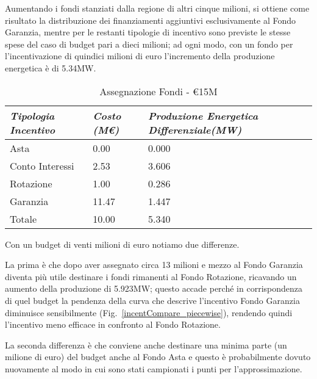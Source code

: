 
Aumentando i fondi stanziati dalla regione di altri cinque milioni, si ottiene come risultato la distribuzione dei finanziamenti aggiuntivi esclusivamente al Fondo Garanzia, mentre per le restanti tipologie di incentivo sono previste le stesse spese del caso di budget pari a dieci milioni; ad ogni modo, con un fondo per l'incentivazione di quindici milioni di euro l'incremento della produzione energetica è di 5.34MW.

\begin{table}[h]
\centering
	\begin{tabular}{ p{}  | p{} | p{}  }
		\hline \hline 
		\nohyphens{\emph{Tipologia Incentivo}} & \nohyphens{\emph{Costo (M\euro)}} & \nohyphens{\emph{Produzione Energetica Differenziale(MW)}} \\ \hline
		Asta &  0.00 & 0.000 \\ 
		Conto Interessi & 2.53 & 3.606 \\ 
		Rotazione & 1.00 & 0.286 \\ 
		Garanzia & 11.47 & 1.447 \\ \hline 
		Totale & 10.00 & 5.340 \\
		\hline \hline 
	\end{tabular}
	\caption{Assegnazione Fondi - \euro15M}
	\label{tab:assegnFondi15M}	
\end{table}


Con un budget di venti milioni di euro notiamo due differenze. 

La prima è che dopo aver assegnato circa 13 milioni e mezzo al Fondo Garanzia diventa più utile destinare i fondi rimanenti al Fondo Rotazione, ricavando un aumento della produzione di 5.923MW; questo accade perché in corrispondenza di quel budget la pendenza della curva che descrive l'incentivo Fondo Garanzia diminuisce sensibilmente (Fig.~\ref{incentCompare_piecewise}), rendendo quindi l'incentivo meno efficace in confronto al Fondo Rotazione.

La seconda differenza è che conviene anche destinare una minima parte (un milione di euro) del budget anche al Fondo Asta e questo è probabilmente dovuto nuovamente al modo in cui sono stati campionati i punti per l'approssimazione.

